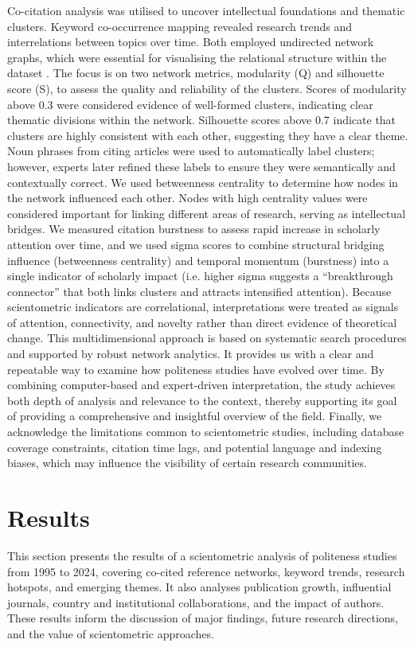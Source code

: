 \documentclass[english]{textolivre}
\begin{document}
Co-citation analysis was utilised to uncover intellectual foundations and thematic clusters. Keyword co-occurrence mapping revealed research trends and interrelations between topics over time. Both employed undirected network graphs, which were essential for visualising the relational structure within the dataset \cite{boyack2013}. The focus is on two network metrics, modularity (Q) and silhouette score (S), to assess the quality and reliability of the clusters. Scores of modularity above 0.3 were considered evidence of well-formed clusters, indicating clear thematic divisions within the network. Silhouette scores above 0.7 indicate that clusters are highly consistent with each other, suggesting they have a clear theme. Noun phrases from citing articles were used to automatically label clusters; however, experts later refined these labels to ensure they were semantically and contextually correct. We used betweenness centrality to determine how nodes in the network influenced each other. Nodes with high centrality values were considered important for linking different areas of research, serving as intellectual bridges. We measured citation burstness to assess rapid increase in scholarly attention over time, and we used sigma scores to combine structural bridging influence (betweenness centrality) and temporal momentum (burstness) into a single indicator of scholarly impact (i.e. higher sigma suggests a ``breakthrough connector'' that both links clusters and attracts intensified attention). Because scientometric indicators are correlational, interpretations were treated as signals of attention, connectivity, and novelty rather than direct evidence of theoretical change. This multidimensional approach is based on systematic search procedures and supported by robust network analytics. It provides us with a clear and repeatable way to examine how politeness studies have evolved over time. By combining computer-based and expert-driven interpretation, the study achieves both depth of analysis and relevance to the context, thereby supporting its goal of providing a comprehensive and insightful overview of the field. Finally, we acknowledge the limitations common to scientometric studies, including database coverage constraints, citation time lags, and potential language and indexing biases, which may influence the visibility of certain research communities.

\section{Results}
This section presents the results of a scientometric analysis of politeness studies from 1995 to 2024, covering co-cited reference networks, keyword trends, research hotspots, and emerging themes. It also analyses publication growth, influential journals, country and institutional collaborations, and the impact of authors. These results inform the discussion of major findings, future research directions, and the value of scientometric approaches.
\end{document}
